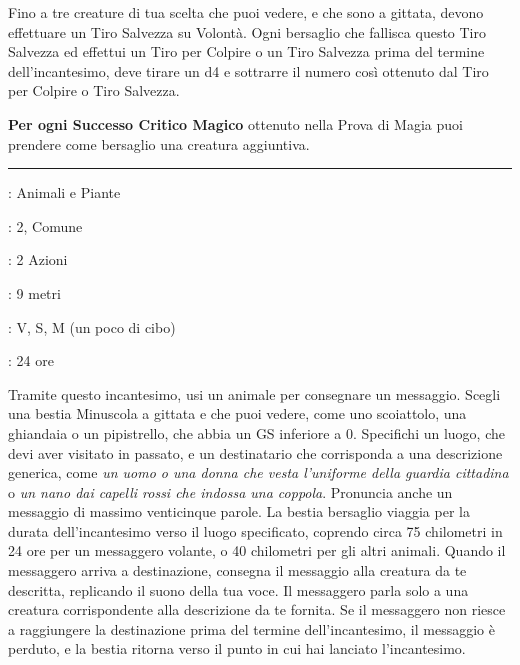\begin{multicols}{2}
Fino a tre creature di tua scelta che puoi vedere, e che sono a gittata, devono effettuare un Tiro Salvezza su Volontà. Ogni bersaglio che fallisca questo Tiro Salvezza ed effettui un Tiro per Colpire o un Tiro Salvezza prima del termine dell'incantesimo, deve tirare un d4 e sottrarre il numero così ottenuto dal Tiro per Colpire o Tiro Salvezza.

\textbf{Per ogni Successo Critico Magico} ottenuto nella Prova di Magia puoi prendere come bersaglio una creatura aggiuntiva.

\smallskip\noindent\rule{\linewidth}{2pt} \hypertarget{Animale Messaggero}{}\medskip{}\label{Animal Messenger}
\noindent
\begin{description}[noitemsep, topsep=0pt, parsep=0pt, partopsep=0pt, leftmargin=0cm, labelwidth=2.8cm]
\item[\textbf{Lista di Magia}]: Animali e Piante
\item[\textbf{Livello}]: 2, Comune
\item[\textbf{T. di Lancio}]: 2 Azioni
\item[\textbf{Gittata}]: 9 metri
\item[\textbf{Componenti}]: V, S, M (un poco di cibo)
\item[\textbf{Durata}]: 24 ore
\end{description}

Tramite questo incantesimo, usi un animale per consegnare un messaggio. Scegli una bestia Minuscola a gittata e che puoi vedere, come uno scoiattolo, una ghiandaia o un pipistrello, che abbia un GS inferiore a 0. Specifichi un luogo, che devi aver visitato in passato, e un destinatario che corrisponda a una descrizione generica, come \emph{un uomo o una donna che vesta l'uniforme della guardia cittadina} o \emph{un nano dai capelli rossi che indossa una coppola}. Pronuncia anche un messaggio di massimo venticinque parole. La bestia bersaglio viaggia per la durata dell'incantesimo verso il luogo specificato, coprendo circa 75 chilometri in 24 ore per un messaggero volante, o 40 chilometri per gli altri animali. Quando il messaggero arriva a destinazione, consegna il messaggio alla creatura da te descritta, replicando il suono della tua voce. Il messaggero parla solo a una creatura corrispondente alla descrizione da te fornita. Se il messaggero non riesce a raggiungere la destinazione prima del termine dell'incantesimo, il messaggio è perduto, e la bestia ritorna verso il punto in cui hai lanciato l'incantesimo.


\end{multicols}
